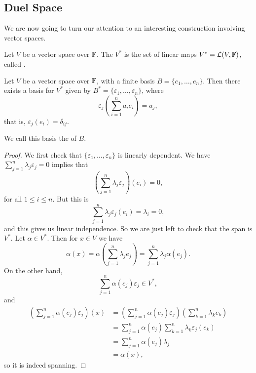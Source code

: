 \documentclass[a4paper]{scrartcl}
\begin{document}
\subsection{Duel Space}

We are now going to turn our attention to an interesting construction involving vector spaces.

\begin{definition}
    Let $V$ be a vector space over $\mathbb{F}$. The  $V^*$ is the set of linear maps $V^* = \mathcal{L}(V, \mathbb{F})$, called .
\end{definition}

\begin{lemma}
    Let $V$ be a vector space over $\mathbb{F}$, with a finite basis $B = \{e_1, \dots, e_n\}$. Then there exists a basis for $V^*$ given by $B^* = \{\varepsilon_1, \dots, \varepsilon_n\}$, where
    $$
    \varepsilon_j \left(\sum_{i = 1}^n a_i e_i\right) = a_j,
    $$
    that is, $\varepsilon_j(e_i) = \delta_{ij}$.

    We call this basis the  of $B$.
\end{lemma}
\begin{proof}
    We first check that $\{\varepsilon_1, \dots, \varepsilon_n\}$ is linearly dependent. We have
    $\sum_{j = 1}^n \lambda_j \varepsilon_j = 0$ implies that
    $$
    \left(\sum_{j = 1}^n \lambda_j \varepsilon_j\right)(e_i) = 0,
    $$
    for all $1 \leq i \leq n$. But this is
    $$
    \sum_{j = 1}^n \lambda_j \varepsilon_j(e_i) = \lambda_i = 0,
    $$
    and this gives us linear independence.
    So we are just left to check that the span is $V^*$. Let $\alpha \in V^*$. Then for $x \in V$ we have
    $$
    \alpha(x) = \alpha\left(\sum_{j = 1}^n \lambda_j e_j\right) = \sum_{j = 1}^n \lambda_j \alpha(e_j).
    $$
    On the other hand,
    $$
\sum_{j = 1}^n \alpha(e_j) \varepsilon_j \in V^*,
    $$
    and 
    \begin{align*}
        \left(\sum_{j = 1}^n \alpha(e_j) \varepsilon_j\right)(x) &= \left(\sum_{j = 1}^n \alpha(e_j) \varepsilon_j\right)\left(\sum_{k = 1}^n \lambda_k e_k\right)  \\
        &= \sum_{j = 1}^n \alpha(e_j) \sum_{k = 1}^n \lambda_k \varepsilon_j(e_k) \\
        &= \sum_{j = 1}^{n}\alpha(e_j) \lambda_j \\
        &= \alpha(x),
    \end{align*}
    so it is indeed spanning.
\end{proof}
\end{document}
